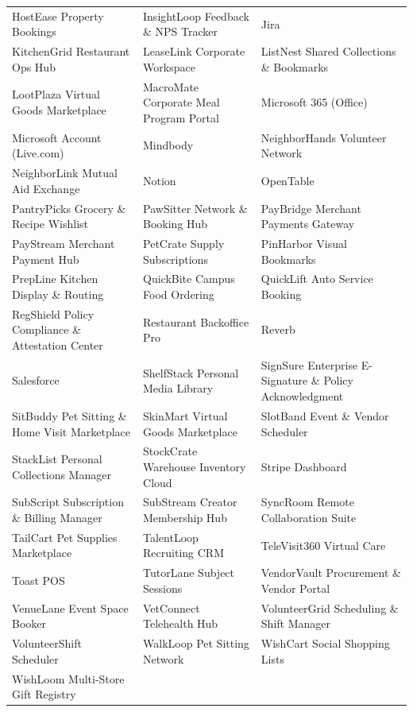 \begin{table}[t]
\begin{tabular}{p{5.2cm}p{5.2cm}p{5.2cm}}
HostEase Property Bookings & InsightLoop Feedback \& NPS Tracker & Jira \\
KitchenGrid Restaurant Ops Hub & LeaseLink Corporate Workspace & ListNest Shared Collections \& Bookmarks \\
LootPlaza Virtual Goods Marketplace & MacroMate Corporate Meal Program Portal & Microsoft 365 (Office) \\
Microsoft Account (Live.com) & Mindbody & NeighborHands Volunteer Network \\
NeighborLink Mutual Aid Exchange & Notion & OpenTable \\
PantryPicks Grocery \& Recipe Wishlist & PawSitter Network \& Booking Hub & PayBridge Merchant Payments Gateway \\
PayStream Merchant Payment Hub & PetCrate Supply Subscriptions & PinHarbor Visual Bookmarks \\
PrepLine Kitchen Display \& Routing & QuickBite Campus Food Ordering & QuickLift Auto Service Booking \\
RegShield Policy Compliance \& Attestation Center & Restaurant Backoffice Pro & Reverb \\
Salesforce & ShelfStack Personal Media Library & SignSure Enterprise E-Signature \& Policy Acknowledgment \\
SitBuddy Pet Sitting \& Home Visit Marketplace & SkinMart Virtual Goods Marketplace & SlotBand Event \& Vendor Scheduler \\
StackList Personal Collections Manager & StockCrate Warehouse Inventory Cloud & Stripe Dashboard \\
SubScript Subscription \& Billing Manager & SubStream Creator Membership Hub & SyncRoom Remote Collaboration Suite \\
TailCart Pet Supplies Marketplace & TalentLoop Recruiting CRM & TeleVisit360 Virtual Care \\
Toast POS & TutorLane Subject Sessions & VendorVault Procurement \& Vendor Portal \\
VenueLane Event Space Booker & VetConnect Telehealth Hub & VolunteerGrid Scheduling \& Shift Manager \\
VolunteerShift Scheduler & WalkLoop Pet Sitting Network & WishCart Social Shopping Lists \\
WishLoom Multi-Store Gift Registry & & \\
\bottomrule
\end{tabular}
\end{table}
